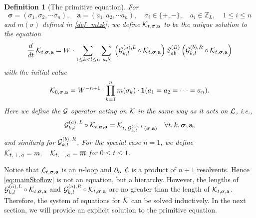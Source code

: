 \documentclass[10pt,reqno]{article}
\newcommand{\be}{\begin{equation}}
\newcommand{\ee}{\end{equation}}
\theoremstyle{plain} %
\newtheorem{definition}[theorem]{Definition}
\theoremstyle{remark}
\numberwithin{equation}{section}
\begin{document}
\begin{definition}[The primitive equation]\label{Def_Ktza}
For 
$$
\boldsymbol{\sigma}=(\sigma_1, \sigma_2, \cdots \sigma_n),\quad 
\boldsymbol{a}=(a_1, a_2, \cdots a_n)
,\quad \sigma_i \in \{+,-\}, \quad
a_i\in \mathbb Z_L, \quad 1\le i\le n
$$
and  $m(\sigma)$ defined in \eqref{def_mtzk}, we define  ${\cal K}_{t, \boldsymbol{\sigma}, \textbf{a}}$ to be the unique solution to the equation 
 \begin{align}\label{pro_dyncalK}
       \frac{d}{dt}\,{\cal K}_{t, \boldsymbol{\sigma}, \textbf{a}} 
       =  
       {W}\cdot  \sum_{1 \le k < l \le n} \sum_{a, b} \; \left( {\cal G}^{(a), L}_{k, l} \circ {\cal K}_{t, \boldsymbol{\sigma}, \textbf{a}} \right) S^{(B)}_{ab} \left( {\cal G}^{(b), R}_{k, l} \circ {\cal K}_{t, \boldsymbol{\sigma}, \textbf{a}} \right)  
    \end{align}
with the initial value 
$$
    {\cal K}_{0, \boldsymbol{\sigma}, \textbf{a}} =  {W^{-n+1}} \cdot \prod_{k=1}^n m (\sigma_k) \cdot \textbf{1}(a_1 = a_2 = \cdots = a_n).
$$
Here we define the ${\cal G}$ operator acting on ${\cal K}$ in the same way as it acts on ${\cal L}$,  i.e.,  
  \be\label{calGonIND}
     {\cal G}^{(a),\,L }_{k,l}  \circ {\cal K}_{t, \boldsymbol{\sigma}, \textbf{a}} = {\cal K}_{t, \; {\cal G}^{(a),\,L }_{k,l}  (\boldsymbol{\sigma}, \textbf{a})}  \quad \forall t, k, \boldsymbol{\sigma}, \textbf{a},   
       \ee
and similarly for  ${\cal G}^{(b),\, R }_{k,l}$. 
For the special case $n=1$, we define %
$
{\cal K}_{t,\,+,\, a}=m,\quad {\cal K}_{t,\,-,\, a}=\overline m$ for $0\le t\le 1$. 
\end{definition}

Notice that  ${\cal L}_{t, \boldsymbol{\sigma}, \textbf{a}}$ is an $n$-loop and $\partial_{  \alpha} \; {\cal L}$ is a product of $n+1$ resolvents. Hence  \eqref{eq:mainStoflow} is not an equation, but  a hierarchy. However, the  lengths of ${\cal G}^{(a), L}_{k, l} \circ {\cal K}_{t, \boldsymbol{\sigma}, \textbf{a}}$ and ${\cal G}^{(a), R}_{k, l} \circ {\cal K}_{t, \boldsymbol{\sigma}, \textbf{a}}$ are no greater than the  length of ${\cal K}_{t, \boldsymbol{\sigma}, \textbf{a}}$. Therefore, 
the system of equations for $\cal K$ can be solved inductively. 
 In the next section, we will provide an explicit  solution to the primitive equation.  




\end{document}

